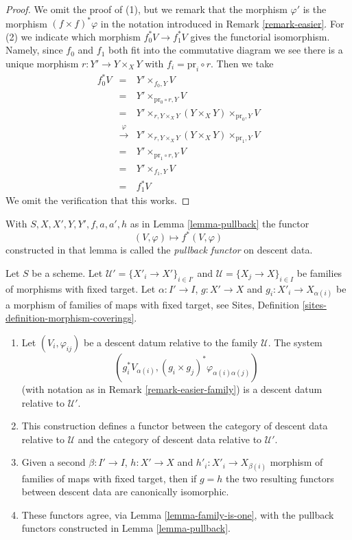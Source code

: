\begin{proof}
We omit the proof of (1), but we remark that the morphism
$\varphi'$ is the morphism $(f \times f)^*\varphi$ in the
notation introduced in Remark \ref{remark-easier}.
For (2) we indicate which morphism
$f_0^*V \to f_1^*V$ gives the functorial isomorphism. Namely,
since $f_0$ and $f_1$ both fit into the commutative diagram
we see there is a unique morphism $r : Y' \to Y \times_X Y$
with $f_i = \text{pr}_i \circ r$. Then we take
\begin{eqnarray*}
f_0^*V & = &
Y' \times_{f_0, Y} V \\
& = &
Y' \times_{\text{pr}_0 \circ r, Y} V \\
& = &
Y' \times_{r, Y \times_X Y} (Y \times_X Y) \times_{\text{pr}_0, Y} V \\
& \xrightarrow{\varphi} &
Y' \times_{r, Y \times_X Y} (Y \times_X Y) \times_{\text{pr}_1, Y} V \\
& = &
Y' \times_{\text{pr}_1 \circ r, Y} V \\
& = &
Y' \times_{f_1, Y} V \\
& = & f_1^*V
\end{eqnarray*}
We omit the verification that this works.
\end{proof}

\begin{definition}
\label{definition-pullback-functor}
With $S, X, X', Y, Y', f, a, a', h$ as in Lemma \ref{lemma-pullback}
the functor
$$
(V, \varphi) \longmapsto f^*(V, \varphi)
$$
constructed in that lemma is called the {\it pullback functor} on descent data.
\end{definition}

\begin{lemma}
\label{lemma-pullback-family}
Let $S$ be a scheme. Let $\mathcal{U}' = \{X'_i \to X'\}_{i \in I'}$ and
$\mathcal{U} = \{X_j \to X\}_{i \in I}$ be families of morphisms with
fixed target. Let $\alpha : I' \to I$, $g : X' \to X$ and
$g_i : X'_i \to X_{\alpha(i)}$ be a morphism of families
of maps with fixed target, see
Sites, Definition \ref{sites-definition-morphism-coverings}.
\begin{enumerate}
\item Let $(V_i, \varphi_{ij})$ be a descent datum relative to the
family $\mathcal{U}$. The system
$$
\left(
g_i^*V_{\alpha(i)}, (g_i \times g_j)^*\varphi_{\alpha(i) \alpha(j)}
\right)
$$
(with notation as in Remark \ref{remark-easier-family})
is a descent datum relative to $\mathcal{U}'$.
\item This construction defines a functor between the category of
descent data relative to $\mathcal{U}$ and the category of
descent data relative to $\mathcal{U}'$.
\item Given a second $\beta : I' \to I$, $h : X' \to X$ and
$h'_i : X'_i \to X_{\beta(i)}$ morphism of families
of maps with fixed target, then if $g = h$ the two resulting functors
between descent data are canonically isomorphic.
\item These functors agree, via Lemma \ref{lemma-family-is-one},
with the pullback functors constructed in Lemma \ref{lemma-pullback}.
\end{enumerate}
\end{lemma}

